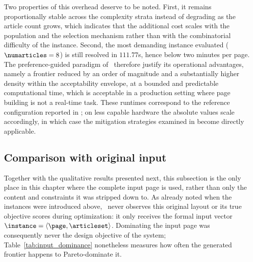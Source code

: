 Two properties of this overhead deserve to be noted. First, it remains proportionally stable across the complexity strata instead of degrading as the article count grows, which indicates that the additional cost scales with the population and the selection mechanism rather than with the combinatorial difficulty of the instance. Second, the most demanding instance evaluated ($\numarticles = 8$) is still resolved in $111.77$s, hence below two minutes per page. The preference-guided paradigm of \methodName\ therefore justify its operational advantages, namely a frontier reduced by an order of magnitude and a substantially higher density within the acceptability envelope, at a bounded and predictable computational time, which is acceptable in a production setting where page building is not a real-time task. These runtimes correspond to the reference configuration reported in ; on less capable hardware the absolute values scale accordingly, in which case the mitigation strategies examined in  become directly applicable.


\subsection{Comparison with original input}
\label{sec:comparison-with-input}

Together with the qualitative results presented next, this subsection is the only place in this chapter where the complete input page is used, rather than only the content and constraints it was stripped down to. As already noted when the instances were introduced above, \methodName\ never observes this original layout or its true objective scores during optimization: it only receives the formal input vector $\instance = \langle \page, \articleset \rangle$. 
Dominating the input page was consequently never the design objective of the system; Table~\ref{tab:input_dominance} nonetheless measures how often the generated frontier happens to Pareto-dominate it.


